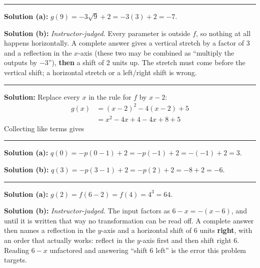 \documentclass[12pt]{article}
\begin{document}
\vspace{0.1cm}\noindent\rule{\linewidth}{0.2pt}


\textbf{Solution (a):} $g(9) = -3\sqrt{9} + 2 = -3(3) + 2 = -7$. 

\textbf{Solution (b):} \emph{Instructor-judged.} Every parameter is outside $f$, so nothing at all happens horizontally. A complete answer gives a vertical stretch by a factor of $3$ and a reflection in the $x$-axis (these two may be combined as ``multiply the outputs by $-3$''), \textbf{then} a shift of $2$ units up. The stretch must come before the vertical shift; a horizontal stretch or a left/right shift is wrong.

\vspace{0.1cm}\noindent\rule{\linewidth}{0.2pt}


\textbf{Solution:} Replace every $x$ in the rule for $f$ by $x - 2$:
\begin{align*}
  g(x) &= (x - 2)^{2} - 4(x - 2) + 5 \\
       &= x^{2} - 4x + 4 - 4x + 8 + 5
\end{align*}
Collecting like terms gives 

\vspace{0.1cm}\noindent\rule{\linewidth}{0.2pt}


\textbf{Solution (a):} $q(0) = -p(0 - 1) + 2 = -p(-1) + 2 = -(-1) + 2 = 3$. 

\textbf{Solution (b):} $q(3) = -p(3 - 1) + 2 = -p(2) + 2 = -8 + 2 = -6$. 

\vspace{0.1cm}\noindent\rule{\linewidth}{0.2pt}


\textbf{Solution (a):} $g(2) = f(6 - 2) = f(4) = 4^{3} = 64$. 

\textbf{Solution (b):} \emph{Instructor-judged.} The input factors as $6 - x = -(x - 6)$, and until it is written that way no transformation can be read off. A complete answer then names a reflection in the $y$-axis and a horizontal shift of $6$ units \textbf{right}, with an order that actually works: reflect in the $y$-axis first and then shift right $6$. Reading $6 - x$ unfactored and answering ``shift $6$ left'' is the error this problem targets.
\end{document}

